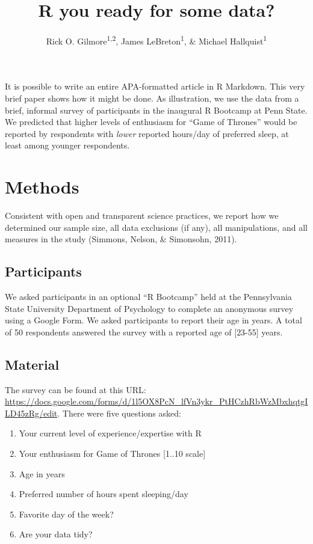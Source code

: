 \documentclass[english,man]{apa6}
\title{R you ready for some data?}
\author{Rick O. Gilmore\textsuperscript{1,2}, James LeBreton\textsuperscript{1}, \& Michael Hallquist\textsuperscript{1}}
\affiliation{
    \vspace{0.5cm}
          \textsuperscript{1} The Pennsylvania State University\\
          \textsuperscript{2} Databrary.org  }
\providecommand{\tightlist}{%
  \setlength{\itemsep}{0pt}\setlength{\parskip}{0pt}}
\theoremstyle{definition}
\theoremstyle{definition}
\theoremstyle{remark}
\begin{document}
\maketitle

\setcounter{secnumdepth}{0}



It is possible to write an entire APA-formatted article in R Markdown.
This very brief paper shows how it might be done. As illustration, we
use the data from a brief, informal survey of participants in the
inaugural R Bootcamp at Penn State. We predicted that higher levels of
enthusiasm for \enquote{Game of Thrones} would be reported by
respondents with \emph{lower} reported hours/day of preferred sleep, at
least among younger respondents.

\section{Methods}\label{methods}

Consistent with open and transparent science practices, we report how we
determined our sample size, all data exclusions (if any), all
manipulations, and all measures in the study (Simmons, Nelson, \&
Simonsohn, 2011).

\subsection{Participants}\label{participants}

We asked participants in an optional \enquote{R Bootcamp} held at the
Pennsylvania State University Department of Psychology to complete an
anonymous survey using a Google Form. We asked participants to report
their age in years. A total of 50 respondents answered the survey with a
reported age of {[}23-55{]} years.

\subsection{Material}\label{material}

The survey can be found at this URL:
\url{https://docs.google.com/forms/d/1l5OX8PcN_lfVn3ykr_PtHCzhRbWzMbxhqtgILD45zRg/edit}.
There were five questions asked:

\begin{enumerate}
\def\labelenumi{\arabic{enumi}.}
\tightlist
\item
  Your current level of experience/expertise with R
\item
  Your enthusiasm for Game of Thrones {[}1..10 scale{]}
\item
  Age in years
\item
  Preferred number of hours spent sleeping/day
\item
  Favorite day of the week?
\item
  Are your data tidy?
\end{enumerate}
\end{document}
